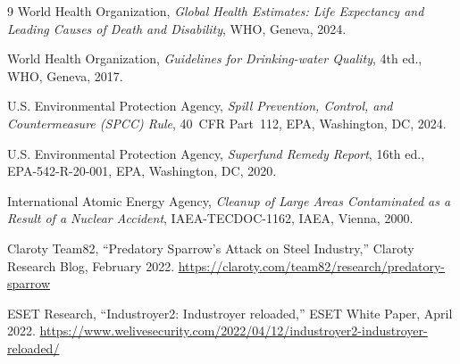 \documentclass[11pt]{article}
\begin{document}
\begin{thebibliography}{9}
World Health Organization,
\emph{Global Health Estimates: Life Expectancy and Leading Causes of Death
and Disability},
WHO, Geneva, 2024.

World Health Organization,
\emph{Guidelines for Drinking-water Quality}, 4th ed.,
WHO, Geneva, 2017.

U.S. Environmental Protection Agency,
\emph{Spill Prevention, Control, and Countermeasure (SPCC) Rule},
40~CFR Part~112, EPA, Washington, DC, 2024.

U.S. Environmental Protection Agency,
\emph{Superfund Remedy Report}, 16th ed.,
EPA-542-R-20-001, EPA, Washington, DC, 2020.

International Atomic Energy Agency,
\emph{Cleanup of Large Areas Contaminated as a Result of a Nuclear Accident},
IAEA-TECDOC-1162, IAEA, Vienna, 2000.

Claroty Team82,
``Predatory Sparrow's Attack on Steel Industry,''
Claroty Research Blog, February 2022.
\url{https://claroty.com/team82/research/predatory-sparrow}

ESET Research,
``Industroyer2: Industroyer reloaded,''
ESET White Paper, April 2022.
\url{https://www.welivesecurity.com/2022/04/12/industroyer2-industroyer-reloaded/}

\end{thebibliography}
\end{document}
